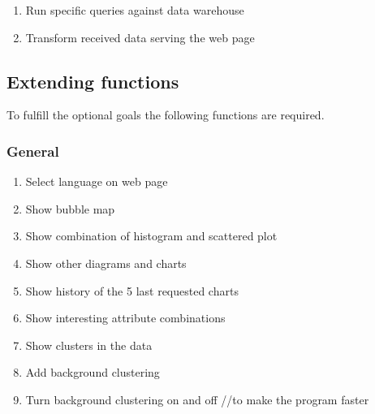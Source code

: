 \begin{enumerate}[resume]
  
  \item Run specific queries against data warehouse \label{f20}
  
  \item Transform received data serving the web page \label{f21}

\end{enumerate}


\subsection{Extending functions}

To fulfill the optional goals the following functions are required.

\subsubsection*{General}
\begin{enumerate}[resume]
  
  \item Select language on web page \label{f22}
  
  \item Show bubble map \label{f23} %
  
  \item Show combination of histogram and scattered plot \label{f24}
  
  \item Show other diagrams and charts \label{f25}
  
  \item Show history of the 5 last requested charts \label{f26}
  \item Show interesting attribute combinations

  \item Show clusters in the data
  
  \item Add background clustering
  
  \item Turn background clustering on and off //to make the program faster


 
\end{enumerate}



